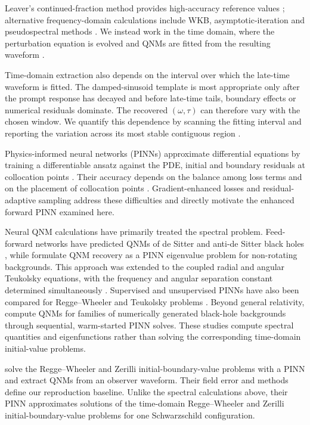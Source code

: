 \documentclass[11pt,a4paper]{article}
\theoremstyle{definition}
\begin{document}
Leaver's continued-fraction method provides high-accuracy
reference values \citep{Leaver1985}; alternative frequency-domain
calculations include WKB, asymptotic-iteration and pseudospectral
methods \citep{Berti2009review,KonoplyaZhidenko2011}. We instead
work in the time domain, where the perturbation equation is
evolved and QNMs are fitted from the resulting waveform
\citep{Buonanno2007ringdown,LIGO2016ringdown,Isi2021priors}.

Time-domain extraction also depends on the interval over which the
late-time waveform is fitted. The damped-sinusoid template is most
appropriate only after the prompt response has decayed and before
late-time tails, boundary effects or numerical residuals dominate.
The recovered $(\omega,\tau)$ can therefore vary with the chosen
window. We quantify this dependence by scanning the fitting interval
and reporting the variation across its most stable contiguous region
\citep{Isi2021priors}.

Physics-informed neural networks (PINNs) approximate differential
equations by training a differentiable ansatz against the PDE,
initial and boundary residuals at collocation points
\citep{Raissi2017,Baydin2018ad,Karniadakis2021piml}. Their accuracy
depends on the balance among loss terms and on the placement of
collocation points \citep{Wang2021gradientpath,Wu2023adaptive}.
Gradient-enhanced losses and residual-adaptive sampling address these
difficulties \citep{Yu2022gpinn,Wu2023adaptive} and directly motivate
the enhanced forward PINN examined here.

Neural QNM calculations have primarily treated the spectral problem.
Feed-forward networks have predicted QNMs of de Sitter and anti-de
Sitter black holes \citep{Ovgun2021qnmnn}, while
\citet{Cornell2022pinnqnm} formulate QNM recovery as a PINN
eigenvalue problem for non-rotating backgrounds. This approach was
extended to the coupled radial and angular Teukolsky equations, with
the frequency and angular separation constant determined simultaneously
\citep{Luna2022teukolskypinn}. Supervised and unsupervised PINNs have
also been compared for Regge--Wheeler and Teukolsky problems
\citep{Cornell2024rwteukolsky}. Beyond general relativity,
\citet{Luna2024qnm} compute QNMs for families of numerically generated
black-hole backgrounds through sequential, warm-started PINN solves.
These studies compute spectral quantities and eigenfunctions rather
than solving the corresponding time-domain initial-value problems.

\citet{Patel2024pinn} solve the Regge--Wheeler and Zerilli
initial-boundary-value problems with a PINN and extract QNMs from an
observer waveform. Their field error and methods define our
reproduction baseline. Unlike the spectral calculations above,
their PINN approximates solutions of the time-domain Regge--Wheeler
and Zerilli initial-boundary-value problems for one Schwarzschild
configuration.
\end{document}
